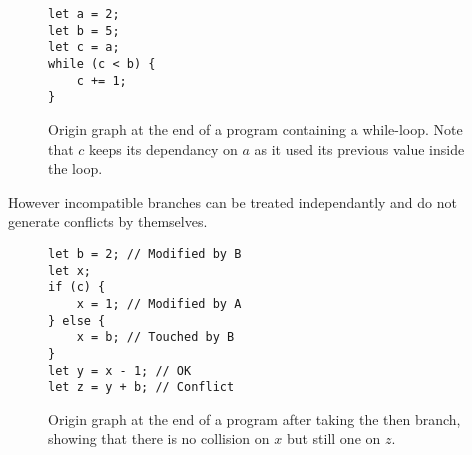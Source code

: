 \documentclass[a4paper,10pt]{article}
\begin{document}
\begin{figure}[ht]
\begin{minipage}{.5\textwidth}
\begin{lstlisting}
let a = 2;
let b = 5;
let c = a;
while (c < b) {
    c += 1;
}
\end{lstlisting}
\end{minipage}\hfill
\begin{minipage}{.45\textwidth}
\centering{}
\end{minipage}
\caption{Origin graph at the end of a program containing a while-loop. Note that $c$ keeps its dependancy on $a$ as it used its previous value inside the loop.}
\end{figure}

However incompatible branches can be treated independantly and do not generate conflicts by themselves.
\begin{figure}[ht]
\begin{minipage}{.5\textwidth}
\begin{lstlisting}
let b = 2; // Modified by B
let x;
if (c) {
    x = 1; // Modified by A
} else {
    x = b; // Touched by B
}
let y = x - 1; // OK
let z = y + b; // Conflict
\end{lstlisting}
\end{minipage}\hfill
\begin{minipage}{.45\textwidth}
\centering{}
\end{minipage}
\caption{Origin graph at the end of a program after taking the then branch, showing that there is no collision on $x$ but still one on $z$.}
\end{figure}
\end{document}
